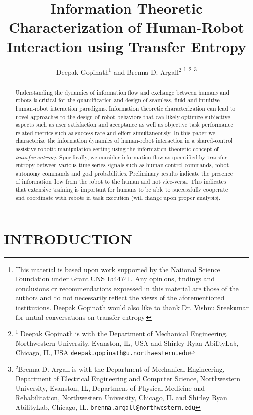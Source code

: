 \documentclass[letterpaper, 10 pt, conference]{ieeeconf}  %
\title{\LARGE \bf
Information Theoretic Characterization of Human-Robot Interaction using Transfer Entropy
}
\author{Deepak Gopinath$^{1}$ and Brenna D. Argall$^{2}$%
\thanks{This material is based upon work supported by the National Science Foundation under Grant CNS 1544741. Any opinions, findings and conclusions or
	recommendations expressed in this material are those of the authors and do
	not necessarily reflect the views of the aforementioned institutions. Deepak Gopinath would also like to thank Dr. Vishnu Sreekumar for initial conversations on transfer entropy.
}%
\thanks{$^{1}$ Deepak Gopinath is with the Department of Mechanical Engineering, Northwestern University, Evanston, IL, USA and Shirley Ryan AbilityLab, Chicago, IL, USA
        {\tt\small deepak.gopinath@u.northwestern.edu}}%
\thanks{$^{2}$Brenna D. Argall is with the Department of Mechanical Engineering, Department of Electrical Engineering and Computer Science, Northwestern University, Evanston, IL, Department of Physical Medicine and Rehabilitation, Northwestern University, Chicago, IL and Shirley Ryan AbilityLab, Chicago, IL.
        {\tt\small brenna.argall@northwestern.edu}}%
}
\begin{document}
\maketitle
\thispagestyle{empty}
\pagestyle{empty}


\begin{abstract}
Understanding the dynamics of information flow and exchange between humans and robots is critical for the quantification and design of seamless, fluid and intuitive human-robot interaction paradigms. Information theoretic characterization can lead to novel approaches to the design of robot behaviors that can likely optimize subjective aspects such as user satisfaction and acceptance as well as objective task performance related metrics such as success rate and effort simultaneously. In this paper we characterize the information dynamics of human-robot interaction in a shared-control assistive robotic manipulation setting using the information theoretic concept of \textit{transfer entropy}. Specifically, we consider information flow as quantified by transfer entropy between various time-series signals such as human control commands, robot autonomy commands and goal probabilities. Preliminary results indicate the presence of information flow from the robot to the human and not vice-versa. This indicates that extensive training is important for humans to be able to successfully cooperate and coordinate with robots in task execution (will change upon proper analysis). 
\end{abstract}


\section{INTRODUCTION}
\end{document}
